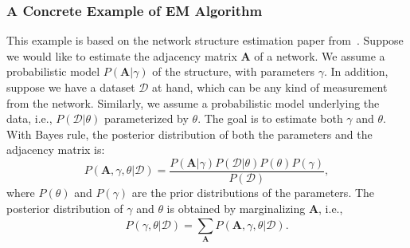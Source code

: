         \subsubsection{A Concrete Example of EM Algorithm}
        This example is based on the network structure estimation paper from~\citet{newman2018estimating}.
        Suppose we would like to estimate the adjacency matrix $\bm{A}$ of a network.
        We assume a probabilistic model $P(\bm{A} | \gamma)$ of the structure, with parameters $\gamma$.
        In addition, suppose we have a dataset $\mathcal{D}$ at hand, which can be any kind of measurement from the network.
        Similarly, we assume a probabilistic model underlying the data, i.e., $P(\mathcal{D} | \theta)$ parameterized by $\theta$.
        The goal is to estimate both $\gamma$ and $\theta$.
        With Bayes rule, the posterior distribution of both the parameters and the adjacency matrix is:
            \begin{equation}
                P(\bm{A}, \gamma, \theta | \mathcal{D}) =  \frac{P(\bm{A}|\gamma) P(\mathcal{D} | \theta) P(\theta) P(\gamma)}{P(\mathcal{D})},
            \end{equation}
        where $P(\theta)$ and $P(\gamma)$ are the prior distributions of the parameters.
        The posterior distribution of $\gamma$ and $\theta$ is obtained by marginalizing $\bm{A}$, i.e., 
            \begin{equation}
                P(\gamma, \theta | \mathcal{D}) = \sum_{\bm{A}}^{}{P(\bm{A}, \gamma, \theta | \mathcal{D})}.
            \end{equation}
            

